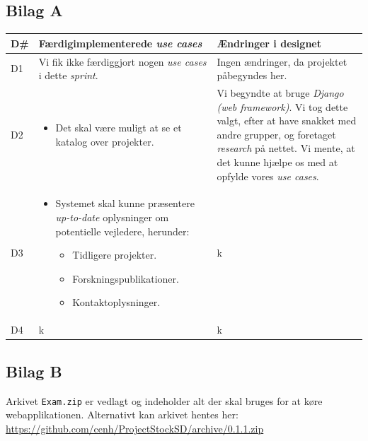 \documentclass[12pt]{article}
\begin{document}
\subsection{Bilag A}
\label{sec:bilagA}
\begin{center}
	\begin{tabular}{|p{}|p{}|p{}|}
		\hline
	\textbf{D\#} & \textbf{Færdigimplementerede \textit{use cases}} & \textbf{Ændringer i designet} \\ \hline

	D1 & Vi fik ikke færdiggjort nogen \textit{use cases} i dette \textit{sprint}. & Ingen ændringer, da projektet påbegyndes her. \\ \hline

	D2 & 		\begin{minipage}[t]{0.4\textwidth}
	\begin{itemize}
		\item Det skal være muligt at se et katalog over projekter.
		\end{itemize}
		\end{minipage} & Vi begyndte at bruge \textit{Django (web framework)}. Vi tog dette valgt, efter at have snakket med andre grupper, og foretaget \textit{research} på nettet. Vi mente, at det kunne hjælpe os med at opfylde vores \textit{use cases}. \\ \hline

	D3 &
	\begin{minipage}[t]{0.4\textwidth}
	\begin{itemize}
		\item Systemet skal kunne præsentere \textit{up-to-date} oplysninger om potentielle vejledere, herunder:
		\begin{itemize}
			\item Tidligere projekter.
			\item Forskningspublikationer.
			\item Kontaktoplysninger.
		\end{itemize}
	\end{itemize}
	\end{minipage} & k \\
		\hline
	D4 & k & k \\ \hline
	\end{tabular}
\end{center}


\subsection{Bilag B}
\label{sec:bilagB}
Arkivet \texttt{Exam.zip} er vedlagt og indeholder alt der skal bruges for at køre webapplikationen.
Alternativt kan arkivet hentes her:\\
\url{https://github.com/cenh/ProjectStockSD/archive/0.1.1.zip}
\end{document}
